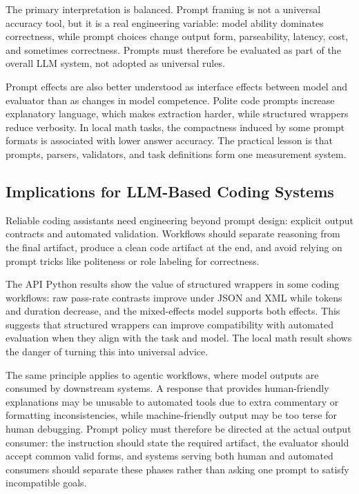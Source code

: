 \documentclass{llncs}
\begin{document}
The primary interpretation is balanced. Prompt framing is not a universal accuracy tool, but it is a real engineering variable: model ability dominates correctness, while prompt choices change output form, parseability, latency, cost, and sometimes correctness. Prompts must therefore be evaluated as part of the overall LLM system, not adopted as universal rules.

Prompt effects are also better understood as interface effects between model and evaluator than as changes in model competence. Polite code prompts increase explanatory language, which makes extraction harder, while structured wrappers reduce verbosity. In local math tasks, the compactness induced by some prompt formats is associated with lower answer accuracy. The practical lesson is that prompts, parsers, validators, and task definitions form one measurement system.

\subsection{Implications for LLM-Based Coding Systems}\label{implications-for-llm-based-coding-systems}

Reliable coding assistants need engineering beyond prompt design: explicit output contracts and automated validation. Workflows should separate reasoning from the final artifact, produce a clean code artifact at the end, and avoid relying on prompt tricks like politeness or role labeling for correctness.

The API Python results show the value of structured wrappers in some coding workflows: raw pass-rate contrasts improve under JSON and XML while tokens and duration decrease, and the mixed-effects model supports both effects. This suggests that structured wrappers can improve compatibility with automated evaluation when they align with the task and model. The local math result shows the danger of turning this into universal advice.

The same principle applies to agentic workflows, where model outputs are consumed by downstream systems. A response that provides human-friendly explanations may be unusable to automated tools due to extra commentary or formatting inconsistencies, while machine-friendly output may be too terse for human debugging. Prompt policy must therefore be directed at the actual output consumer: the instruction should state the required artifact, the evaluator should accept common valid forms, and systems serving both human and automated consumers should separate these phases rather than asking one prompt to satisfy incompatible goals.
\end{document}
